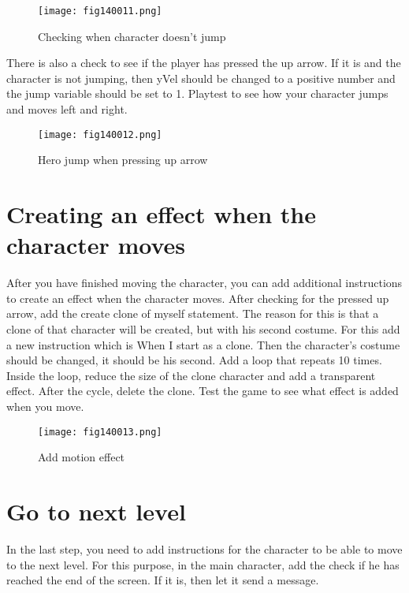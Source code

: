 \begin{figure}[H]
   \centering
   \texttt{[image: fig140011.png]}
   \caption{Checking when character doesn't jump}
\label{fig140011}
\end{figure}

There is also a check to see if the player has pressed the up arrow. If it is and the character is not jumping, then yVel should be changed to a positive number and the jump variable should be set to 1. Playtest to see how your character jumps and moves left and right.

\begin{figure}[H]
   \centering
   \texttt{[image: fig140012.png]}
   \caption{Hero jump when pressing up arrow}
\label{fig140012}
\end{figure}

\section{Creating an effect when the character moves}

After you have finished moving the character, you can add additional instructions to create an effect when the character moves. After checking for the pressed up arrow, add the create clone of myself statement. The reason for this is that a clone of that character will be created, but with his second costume. For this add a new instruction which is When I start as a clone. Then the character's costume should be changed, it should be his second. Add a loop that repeats 10 times. Inside the loop, reduce the size of the clone character and add a transparent effect. After the cycle, delete the clone. Test the game to see what effect is added when you move.

\begin{figure}[H]
   \centering
   \texttt{[image: fig140013.png]}
   \caption{Add motion effect}
\label{fig140013}
\end{figure}

\section{Go to next level}

In the last step, you need to add instructions for the character to be able to move to the next level. For this purpose, in the main character, add the check if he has reached the end of the screen. If it is, then let it send a message.


